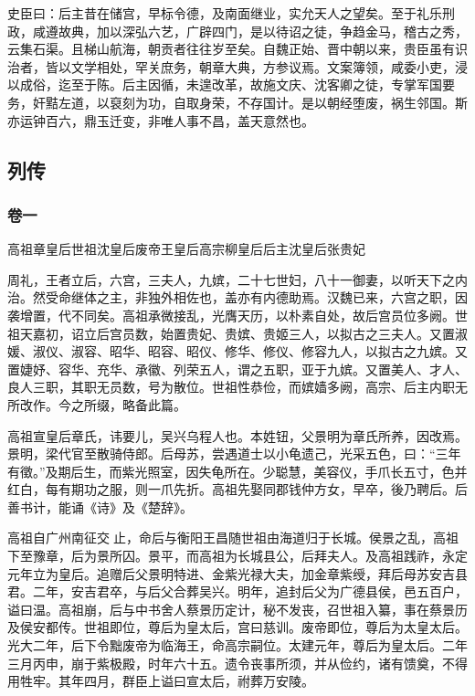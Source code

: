 \documentclass[]{article}
\begin{document}
史臣曰：后主昔在储宫，早标令德，及南面继业，实允天人之望矣。至于礼乐刑政，咸遵故典，加以深弘六艺，广辟四门，是以待诏之徒，争趋金马，稽古之秀，云集石渠。且梯山航海，朝贡者往往岁至矣。自魏正始、晋中朝以来，贵臣虽有识治者，皆以文学相处，罕关庶务，朝章大典，方参议焉。文案簿领，咸委小吏，浸以成俗，迄至于陈。后主因循，未遑改革，故施文庆、沈客卿之徒，专掌军国要务，奸黠左道，以裒刻为功，自取身荣，不存国计。是以朝经堕废，祸生邻国。斯亦运钟百六，鼎玉迁变，非唯人事不昌，盖天意然也。

\hypertarget{header-n4266}{%
\subsection{列传}\label{header-n4266}}

\hypertarget{header-n4267}{%
\subsubsection{卷一}\label{header-n4267}}

高祖章皇后世祖沈皇后废帝王皇后高宗柳皇后后主沈皇后张贵妃

周礼，王者立后，六宫，三夫人，九嫔，二十七世妇，八十一御妻，以听天下之内治。然受命继体之主，非独外相佐也，盖亦有内德助焉。汉魏已来，六宫之职，因袭增置，代不同矣。高祖承微接乱，光膺天历，以朴素自处，故后宫员位多阙。世祖天嘉初，诏立后宫员数，始置贵妃、贵嫔、贵姬三人，以拟古之三夫人。又置淑媛、淑仪、淑容、昭华、昭容、昭仪、修华、修仪、修容九人，以拟古之九嫔。又置婕妤、容华、充华、承徽、列荣五人，谓之五职，亚于九嫔。又置美人、才人、良人三职，其职无员数，号为散位。世祖性恭俭，而嫔嫱多阙，高宗、后主内职无所改作。今之所缀，略备此篇。

高祖宣皇后章氏，讳要儿，吴兴乌程人也。本姓钮，父景明为章氏所养，因改焉。景明，梁代官至散骑侍郎。后母苏，尝遇道士以小龟遗己，光采五色，曰：``三年有徵。''及期后生，而紫光照室，因失龟所在。少聪慧，美容仪，手爪长五寸，色并红白，每有期功之服，则一爪先折。高祖先娶同郡钱仲方女，早卒，後乃聘后。后善书计，能诵《诗》及《楚辞》。

高祖自广州南征交止，命后与衡阳王昌随世祖由海道归于长城。侯景之乱，高祖下至豫章，后为景所囚。景平，而高祖为长城县公，后拜夫人。及高祖践祚，永定元年立为皇后。追赠后父景明特进、金紫光禄大夫，加金章紫绶，拜后母苏安吉县君。二年，安吉君卒，与后父合葬吴兴。明年，追封后父为广德县侯，邑五百户，谥曰温。高祖崩，后与中书舍人蔡景历定计，秘不发丧，召世祖入纂，事在蔡景历及侯安都传。世祖即位，尊后为皇太后，宫曰慈训。废帝即位，尊后为太皇太后。光大二年，后下令黜废帝为临海王，命高宗嗣位。太建元年，尊后为皇太后。二年三月丙申，崩于紫极殿，时年六十五。遗令丧事所须，并从俭约，诸有馈奠，不得用牲牢。其年四月，群臣上谥曰宣太后，祔葬万安陵。
\end{document}
